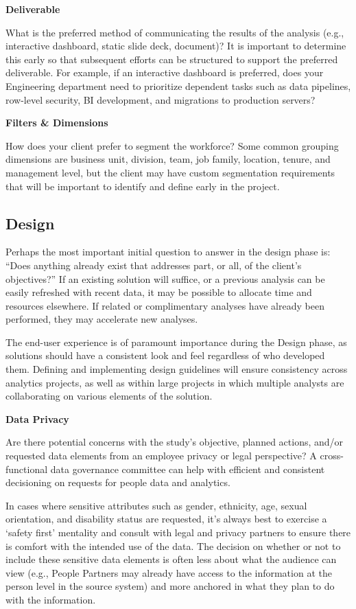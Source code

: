 \documentclass[
]{book}
\begin{document}
\textbf{Deliverable}

What is the preferred method of communicating the results of the analysis (e.g., interactive dashboard, static slide deck, document)? It is important to determine this early so that subsequent efforts can be structured to support the preferred deliverable. For example, if an interactive dashboard is preferred, does your Engineering department need to prioritize dependent tasks such as data pipelines, row-level security, BI development, and migrations to production servers?

\textbf{Filters \& Dimensions}

How does your client prefer to segment the workforce? Some common grouping dimensions are business unit, division, team, job family, location, tenure, and management level, but the client may have custom segmentation requirements that will be important to identify and define early in the project.

\hypertarget{design}{%
\subsection{Design}\label{design}}

Perhaps the most important initial question to answer in the design phase is: ``Does anything already exist that addresses part, or all, of the client's objectives?'' If an existing solution will suffice, or a previous analysis can be easily refreshed with recent data, it may be possible to allocate time and resources elsewhere. If related or complimentary analyses have already been performed, they may accelerate new analyses.

The end-user experience is of paramount importance during the Design phase, as solutions should have a consistent look and feel regardless of who developed them. Defining and implementing design guidelines will ensure consistency across analytics projects, as well as within large projects in which multiple analysts are collaborating on various elements of the solution.

\textbf{Data Privacy}

Are there potential concerns with the study's objective, planned actions, and/or requested data elements from an employee privacy or legal perspective? A cross-functional data governance committee can help with efficient and consistent decisioning on requests for people data and analytics.

In cases where sensitive attributes such as gender, ethnicity, age, sexual orientation, and disability status are requested, it's always best to exercise a `safety first' mentality and consult with legal and privacy partners to ensure there is comfort with the intended use of the data. The decision on whether or not to include these sensitive data elements is often less about what the audience can view (e.g., People Partners may already have access to the information at the person level in the source system) and more anchored in what they plan to do with the information.
\end{document}
